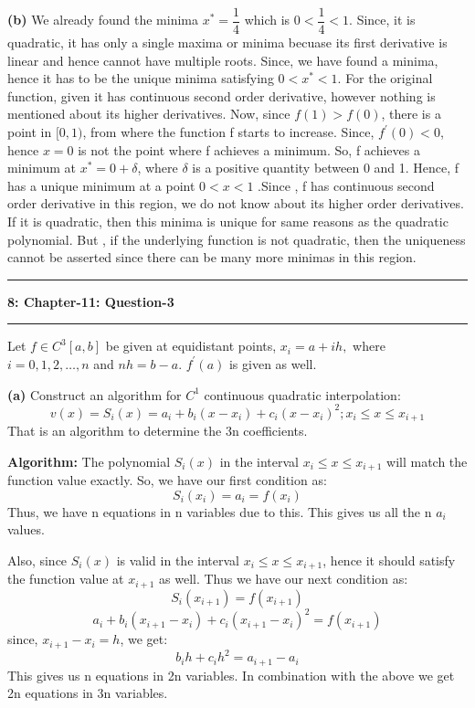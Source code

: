 \documentclass{article}
\newcommand\question[2]{\vspace{.25in}\hrule\textbf{#1: #2}\hrule\vspace{.10in}}
\renewcommand\part[1]{\vspace{.10in}\textbf{(#1)}}
\newcommand\algo{\vspace{.10in}\textbf{Algorithm: }}
\begin{document}
\part{b}
We already found the minima $x^* = \dfrac{1}{4}$ which is $0 < \dfrac{1}{4} < 1$. Since, it is quadratic, it has only a single maxima or minima becuase its first derivative is linear and hence cannot have multiple roots. Since, we have found a minima, hence it has to be the unique minima satisfying $0 < x^* < 1$. 
For the original function, given it has continuous second order derivative, however nothing is mentioned about its higher derivatives. Now, since $f(1) > f(0)$, there is a point in $[0,1)$, from where the function f starts to increase. Since, $f^\prime(0) < 0$, hence $x=0$ is not the point where f achieves a minimum. So, f achieves a minimum at $x^* = 0 + \delta$, where $\delta$ is a positive quantity between 0 and 1. Hence, f has a unique minimum at a point $0 < x < 1$ .Since , f has continuous second order derivative in this region, we do not know about its higher order derivatives. If it is quadratic, then this minima is unique for same reasons as the quadratic polynomial. But , if the underlying function is not quadratic, then the uniqueness cannot be asserted since there can be many more minimas in this region. 


\question{8}{Chapter-11: Question-3}
Let $f \in C^3[a,b]$ be given at equidistant points, $x_i = a + ih,$ where $i=0,1,2, \dots, n$ and $nh = b-a$. $f^\prime(a)$ is given as well. \newline

\part{a} Construct an algorithm for $C^1$ continuous quadratic interpolation: \newline
\[ v(x) = S_i(x) = a_i + b_i(x - x_i) + c_i(x - x_i)^2 ; x_i \leq x \leq x_{i+1}\]
That is an algorithm to determine the 3n coefficients. \newline

\algo
 The polynomial $S_i(x)$ in the interval $x_i \leq x \leq x_{i+1}$ will match the function value exactly. So, we have our first condition as:
	\[S_i(x_i) = a_i = f(x_i) \]
Thus, we have n equations in n variables due to this.
This gives us all the n $a_i$ values. \newline

Also, since $S_i(x)$ is valid in the interval $x_i \leq x \leq x_{i+1}$, hence it should satisfy the function value at $x_{i+1}$ as well. Thus we have our next condition as: 
\[ S_i(x_{i+1}) = f(x_{i+1}) \]
\[ a_i + b_i(x_{i+1} - x_i) + c_i(x_{i+1} - x_i)^2 = f(x_{i+1})\]
since, $x_{i+1} - x_i = h$, we get:
\[ b_i h + c_i h^2 = a_{i+1} - a_i\]
This gives us n equations in 2n variables. In combination with the above we get 2n equations in 3n variables. \newline
\end{document}
